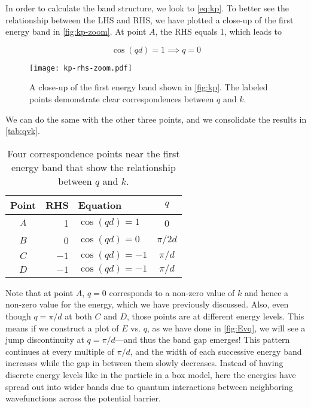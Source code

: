 In order to calculate the band structure, we look to \autoref{eq:kp}. 
To better see the relationship between the LHS and RHS, we have plotted a close-up of the first energy band in \autoref{fig:kp-zoom}. 
At point $A$, the RHS equals 1, which leads to

\begin{equation*}
	\cos(qd) = 1 \implies q = 0
\end{equation*}

\begin{figure}[!h]
	\centering 
	\texttt{[image: kp-rhs-zoom.pdf]}
	\caption{A close-up of the first energy band shown in \autoref{fig:kp}. 
	The labeled points demonstrate clear correspondences between $q$ and $k$.}
	\label{fig:kp-zoom}
\end{figure}

We can do the same with the other three points, and we consolidate the results in \autoref{tab:qvk}.

\begin{table}[!h]
	\centering
	\begin{tabular}{crlc}
		Point & RHS & Equation & $q$ \\ \toprule
		$A$ & 1 & $\cos(qd) = 1$ & 0 \\
		$B$ & 0 & $\cos(qd) = 0$ & $\pi/2d$ \\
		$C$ & $-1$ & $\cos(qd) = -1$ & $\pi/d$ \\
		$D$ & $-1$ & $\cos(qd) = -1$ & $\pi/d$
	\end{tabular}
	\caption{Four correspondence points near the first energy band that show the relationship between $q$ and $k$.}
	\label{tab:qvk}
\end{table}

Note that at point $A$, $q = 0$ corresponds to a non-zero value of $k$ and hence a non-zero value for the energy, which we have previously discussed. 
Also, even though $q = \pi/d$ at both $C$ and $D$, those points are at different energy levels. 
This means if we construct a plot of $E$ vs. $q$, as we have done in \autoref{fig:Evq}, we will see a jump discontinuity at $q = \pi/d$---and thus the band gap emerges! 
This pattern continues at every multiple of $\pi/d$, and the width of each successive energy band increases while the gap in between them slowly decreases. 
Instead of having discrete energy levels like in the particle in a box model, here the energies have spread out into wider bands due to quantum interactions between neighboring wavefunctions across the potential barrier.

